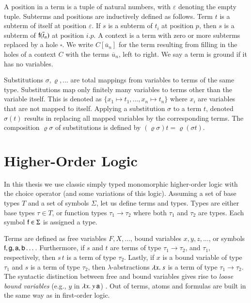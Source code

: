 A position in a term is a tuple of natural numbers, with $\varepsilon$ denoting
the empty tuple. Subterms and positions are inductively defined as follows. Term
$t$ is a subterm of itself at position $\varepsilon$. If $s$ is a subterm of
$t_i$ at position $p$, then $s$ is a subterm of $\mathsf{f}(\overline{t}_{n})$ at
position $i.p$. A context is a term with zero or more subterms replaced by a
hole $\square$. We write $C[\overline{u}_n]$ for the term resulting from filling
in the holes of a context $C$ with the terms $\overline{u}_n$, left to right.
We say a term is ground if it has no variables.

Substitutions $\sigma, \varrho, \ldots$ are total mappings from variables to
terms of the same type. Substitutions map only finitely many variables to terms
other than the variable itself. This is denoted as $\{ x_1 \mapsto t_1, \ldots,
x_n \mapsto t_n \}$ where $x_i$ are variables that are not mapped to itself.
Applying a substitution $\sigma$ to a term $t$, denoted $\sigma(t)$ results in
replacing all mapped variables by the corresponding terms.
The composition $\varrho\sigma$ of substitutions is defined by
$\left(\varrho\sigma\right)t=\varrho\left(\sigma t\right)$.

\section{Higher-Order Logic}

In this thesis we use classic simply typed monomorphic higher-order logic with
the choice operator (and some variations of this logic). Assuming a set of
base types $T$ and a set of symbols $\Sigma$, let us
define terms and types. Types are either base types $\tau \in T$, or function
types $\tau_1 \rightarrow \tau_2$ where both $\tau_1$ and $\tau_2$ are types.
Each symbol $\mathsf{f} \in \Sigma$ is assigned a type.

Terms are defined as free variables $F, X, \ldots$, bound variables $x, y, z,
\dotsc$, or symbols $\mathsf{f}, \mathsf{g},\allowbreak \mathsf{a},\allowbreak \mathsf{b}
\dotsc$. Furthermore, if $s$ and $t$ are terms of type $\tau_1 \rightarrow
\tau_2$, and $\tau_1$, respectively, then $s \, t$ is a term of type $\tau_2$.
Lastly, if $x$ is a bound variable of type $\tau_1$ and $s$ is a term of type
$\tau_2$, then $\lambda$-abstractions $\lambda x.\> s$ is a term of type $\tau_1
\rightarrow \tau_2$. The syntactic distinction between free and bound variables
gives rise to \emph{loose bound variables} (e.g., $y$ in $\lambda x.\> y \, \mathsf{a}$)
\cite{tn-93-patterns}. Out of terms, atoms and formulas are built in the same
way as in first-order logic.

